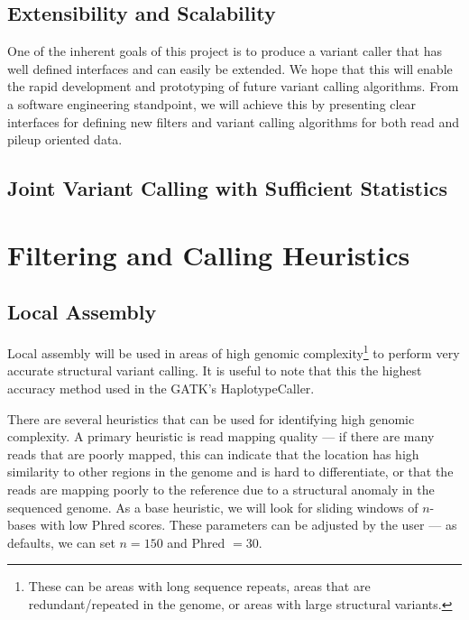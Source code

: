 \documentclass[11pt]{article}
\begin{document}
\subsection{Extensibility and Scalability}
\label{sec:extensibility-and-scalability}

One of the inherent goals of this project is to produce a variant caller that has well defined interfaces and can easily be
extended. We hope that this will enable the rapid development and prototyping of future variant calling algorithms. From
a software engineering standpoint, we will achieve this by presenting clear interfaces for defining new filters and variant
calling algorithms for both read and pileup oriented data.

\subsection{Joint Variant Calling with Sufficient Statistics}
\label{sec:joint-variant-calling}

\section{Filtering and Calling Heuristics}
\label{sec:filtering-calling}

\subsection{Local Assembly}
\label{sec:local-assembly}

Local assembly will be used in areas of high genomic complexity\footnote{These can be areas with long sequence
repeats, areas that are redundant/repeated in the genome, or areas with large structural variants.} to perform very accurate
structural variant calling. It is useful to note that this the highest accuracy method used in the GATK's HaplotypeCaller.

There are several heuristics that can be used for identifying high genomic complexity. A primary heuristic is read mapping
quality --- if there are many reads that are poorly mapped, this can indicate that the location has high similarity to other
regions in the genome and is hard to differentiate, or that the reads are mapping poorly to the reference due to a structural
anomaly in the sequenced genome. As a base heuristic, we will look for sliding windows of $n$-bases with low Phred scores.
These parameters can be adjusted by the user --- as defaults, we can set $n = 150$ and Phred $= 30$.
\end{document}
